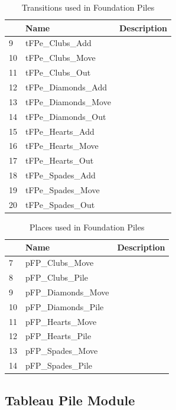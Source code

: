\documentclass[runningheads,a4paper]{llncs}
\begin{document}
\begin{table}
	\caption{Transitions used in Foundation Piles}
	\begin{tabular}{|l|l|l|}
		\hline
		& Name & Description \\
		\hline
		9  & tFPe\_Clubs\_Add         &    \\ \hline
		10 & tFPe\_Clubs\_Move        &    \\ \hline
		11 & tFPe\_Clubs\_Out         &    \\ \hline
		12 & tFPe\_Diamonds\_Add      &    \\ \hline
		13 & tFPe\_Diamonds\_Move     &    \\ \hline
		14 & tFPe\_Diamonds\_Out      &    \\ \hline
		15 & tFPe\_Hearts\_Add        &    \\ \hline
		16 & tFPe\_Hearts\_Move       &    \\ \hline
		17 & tFPe\_Hearts\_Out        &    \\ \hline
		18 & tFPe\_Spades\_Add        &    \\ \hline
		19 & tFPe\_Spades\_Move       &    \\ \hline
		20 & tFPe\_Spades\_Out        &    \\ \hline
	\end{tabular}
\end{table}
\begin{table}
	\caption{Places used in Foundation Piles}
	\begin{tabular}{|l|l|l|}
		\hline
		& Name & Description \\
		\hline
		7  & pFP\_Clubs\_Move          &  \\ \hline
		8  & pFP\_Clubs\_Pile          &  \\ \hline
		9  & pFP\_Diamonds\_Move       &  \\ \hline
		10 & pFP\_Diamonds\_Pile       &  \\ \hline
		11 & pFP\_Hearts\_Move         &  \\ \hline
		12 & pFP\_Hearts\_Pile         &  \\ \hline
		13 & pFP\_Spades\_Move         &  \\ \hline
		14 & pFP\_Spades\_Pile         &  \\ \hline
	\end{tabular}
\end{table}
\subsection{Tableau Pile Module}
\end{document}
